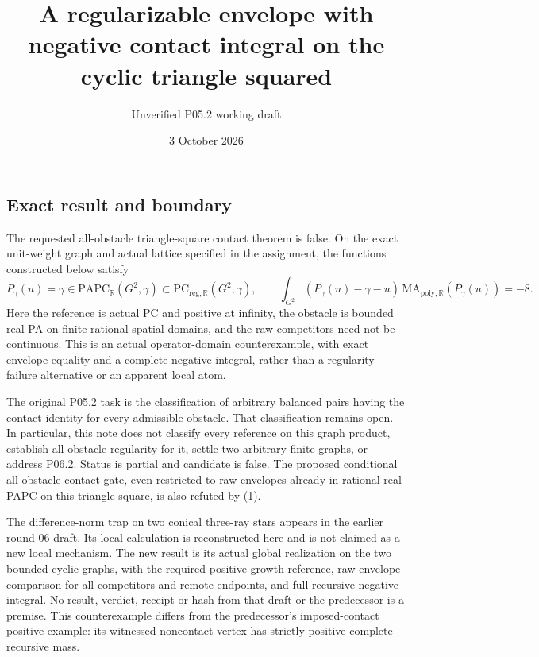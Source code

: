 \documentclass[
  10pt,
]{article}
\title{A regularizable envelope with negative contact integral on the
cyclic triangle squared}
\author{Unverified P05.2 working draft}
\date{3 October 2026}
\begin{document}
\maketitle

\subsection{Exact result and boundary}\label{exact-result-and-boundary}

The requested all-obstacle triangle-square contact theorem is false. On
the exact unit-weight graph and actual lattice specified in the
assignment, the functions constructed below satisfy \[
 P_\gamma(u)=\gamma\in\mathrm{PAPC}_{\mathbb R}(G^2,\gamma)
 \subset\mathrm{PC}_{\mathrm{reg},\mathbb R}(G^2,\gamma),\qquad
 \int_{G^2}(P_\gamma(u)-\gamma-u)\,
           \mathrm{MA}_{\mathrm{poly},\mathbb R}(P_\gamma(u))=-8.
 \tag{1}
\] Here the reference is actual PC and positive at infinity, the
obstacle is bounded real PA on finite rational spatial domains, and the
raw competitors need not be continuous. This is an actual
operator-domain counterexample, with exact envelope equality and a
complete negative integral, rather than a regularity-failure alternative
or an apparent local atom.

The original P05.2 task is the classification of arbitrary balanced
pairs having the contact identity for every admissible obstacle. That
classification remains open. In particular, this note does not classify
every reference on this graph product, establish all-obstacle regularity
for it, settle two arbitrary finite graphs, or address P06.2. Status is
partial and candidate is false. The proposed conditional all-obstacle
contact gate, even restricted to raw envelopes already in rational real
PAPC on this triangle square, is also refuted by (1).

The difference-norm trap on two conical three-ray stars appears in the
earlier round-06 draft. Its local calculation is reconstructed here and
is not claimed as a new local mechanism. The new result is its actual
global realization on the two bounded cyclic graphs, with the required
positive-growth reference, raw-envelope comparison for all competitors
and remote endpoints, and full recursive negative integral. No result,
verdict, receipt or hash from that draft or the predecessor is a
premise. This counterexample differs from the predecessor's
imposed-contact positive example: its witnessed noncontact vertex has
strictly positive complete recursive mass.
\end{document}
